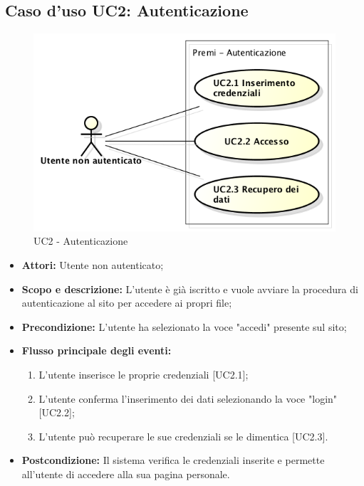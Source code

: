 \subsection{Caso d'uso UC2: Autenticazione}
\begin{figure}[h] 
	\centering 
	\includegraphics[scale=0.45] {img/UC2.png}
	\caption{UC2 - Autenticazione} 
\end{figure}

\begin{itemize}
	\item \textbf{Attori:} Utente non autenticato;
	\item \textbf{Scopo e descrizione:} L'utente è già iscritto e vuole avviare la procedura di autenticazione al sito per accedere ai propri file;
	\item \textbf{Precondizione:} L'utente ha selezionato la voce "accedi" presente sul sito;
	\item \textbf{Flusso principale degli eventi:}
	\begin{enumerate}
		\item L'utente inserisce le proprie credenziali [UC2.1];
		\item L'utente conferma l'inserimento dei dati selezionando la voce "login" [UC2.2];
		\item L'utente può recuperare le sue credenziali se le dimentica [UC2.3].
	\end{enumerate}
	\item \textbf{Postcondizione:} Il sistema verifica le credenziali inserite e permette all'utente di accedere alla sua pagina personale.
\end{itemize}

